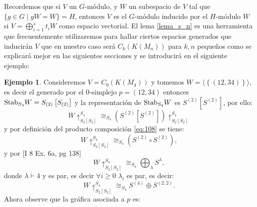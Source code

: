 \documentclass[12pt]{book}
\theoremstyle{definition}
\newtheorem{example}[theorem]{Ejemplo}
\newcounter{in}
\newcounter{ini}
\begin{document}
Recordemos que si $V$ un $G$-módulo, y $W$ un subespacio de $V$ tal que $\{g\in
  G\mid gW=W\}=H$, entonces $V$ es el $G$-módulo inducido por el $H$-módulo $W$ si
  $V=\bigoplus^{s}_{i=1}t_{i}W$ como espacio vectorial. El lema \ref{lema_s_n} es una herramienta que frecuentemente utilizaremos para hallar ciertos espacios generados que inducirán $V$ que en nuestro caso será $C_{k}(K(M_n))$ para $k, n$ pequeños como se explicará mejor en las siguientes secciones y se introducirá en el siguiente ejemplo:
\begin{example}
Consideremos $V = C_{0}(K(M_4))$ y tomemos $W = \langle \left \{ (12,34) \right \} \rangle$, es decir el generado por el $0$-simplejo $p = (12,34)$ entonces $\textup{Stab}_{S_{4}} W = S_{(2)} \left [ S_{(2)} \right ]$ y la representación de $\textup{Stab}_{S_{4}} W$ es $S^{(2)} \left [ S^{(2)} \right ]$, por ello:
\begin{equation}
W \uparrow_{S_{2} \left [ S_{2} \right ]}^{S_{4}} \cong_{S_{4}} (S^{(2)} \left [ S^{(2)} \right ])\uparrow_{S_{2} \left [ S_{2} \right ]}^{S_{4}}
\end{equation}
y por definición del producto composición \ref{eq:108} se tiene:
\begin{equation}
W \uparrow_{S_{2} \left [ S_{2} \right ]}^{S_{4}} \cong_{S_{4}} (S^{(2)} \circ S^{(2)}), 
\end{equation}
y por \cite{macdonald1998symmetric} [I 8 Ex. 6a, pg 138]
\begin{equation}
W \uparrow_{S_{2} \left [ S_{2} \right ]}^{S_{4}} \cong_{S_{4}} \bigoplus_{\lambda} S^{\lambda}, 
\end{equation}
donde $\lambda \vdash 4$ y es par, es decir $\forall i \geq 0$ $\lambda_{i}$ es par, es decir:
\begin{equation}
W \uparrow_{S_{2} \left [ S_{2} \right ]}^{S_{4}} \cong_{S_{4}} S^{(4)} \oplus S^{(2,2)}.
\end{equation}
Ahora observe que la gráfica asociada a $p$ es:
\begin{center}
\end{center}

\end{example}
\end{document}
